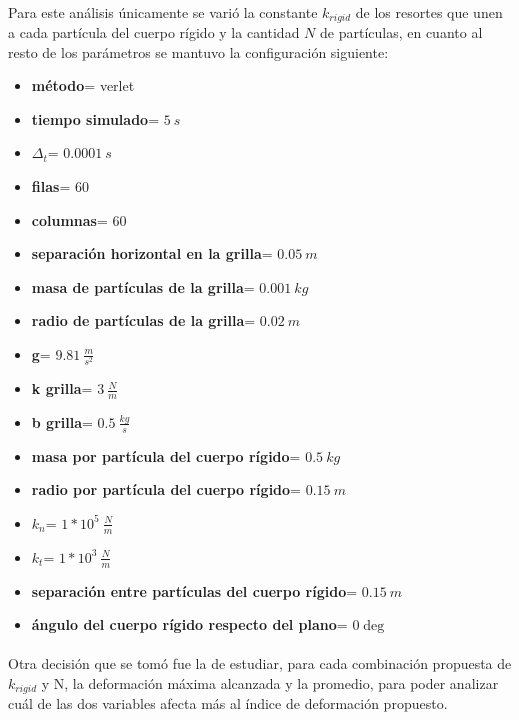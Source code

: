\documentclass[12pt, twocolumn]{article}
\begin{document}
	\paragraph{} Para este análisis únicamente se varió la constante $k_{rigid}$ de los resortes que unen a cada partícula del cuerpo rígido y la cantidad $N$ de partículas, en cuanto al resto de los parámetros se mantuvo la configuración siguiente:
	
	\begin{itemize}
        \item \textbf{método}= verlet
        \item \textbf{tiempo simulado}=  $5\:s$
        \item \textbf{$\Delta_{t}$}= $0.0001\:s$
        \item \textbf{filas}= $60$
        \item \textbf{columnas}= $60$
        \item \textbf{separación horizontal en la grilla}= $0.05\:m$
        \item \textbf{masa de partículas de la grilla}= $0.001\:kg$
        \item \textbf{radio de partículas de la grilla}= $0.02\:m$
        \item \textbf{g}= $9.81\:\frac{m}{s^2}$
        \item \textbf{k grilla}= $3\:\frac{N}{m}$
        \item \textbf{b grilla}= $0.5\:\frac{kg}{s}$
        \item \textbf{masa por partícula del cuerpo rígido}= $0.5\:kg$
        \item \textbf{radio por partícula del cuerpo rígido}= $0.15\:m$
        \item \textbf{$k_{n}$}= $1*10^5\:\frac{N}{m}$
        \item \textbf{$k_{t}$}= $1*10^3\:\frac{N}{m}$
        \item \textbf{separación entre partículas del cuerpo rígido}= $0.15\:m$
        \item \textbf{ángulo del cuerpo rígido respecto del plano}= $0\deg$
	\end{itemize}
	
	\paragraph{} Otra decisión que se tomó fue la de estudiar, para cada combinación propuesta de $k_{rigid}$ y N, la deformación máxima alcanzada y la promedio, para poder analizar cuál de las dos variables afecta más al índice de deformación propuesto.
	
\end{document}
